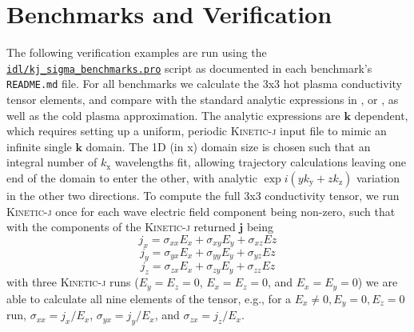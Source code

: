 \documentclass[final,5p,times,twocolumn]{elsarticle}
\renewcommand{\vec}[1]{\mathbf{#1}}
\newcommand{\kj}{\textsc{Kinetic-j}\xspace}
\begin{document}
\section{Benchmarks and Verification}
\label{section:verification}
The following verification examples are run using the \href{https://github.com/ORNL-Fusion/kineticj/blob/master/idl/kj_sigma_benchmarks.pro}{\texttt{idl/kj\_sigma\_benchmarks.pro}} script as documented in each benchmark's \texttt{README.md} file.
%
For all benchmarks we calculate the 3x3 hot plasma conductivity tensor elements, and compare with the standard analytic expressions in \cite[pg. 255 of ][]{brambilla}, or \cite[pg. 176 of][]{swanson}, as well as the cold plasma approximation. The analytic expressions are $\vec{k}$ dependent, which requires setting up a uniform, periodic \kj input file to mimic an infinite single $\vec{k}$ domain. The 1D (in x) domain size is chosen such that an integral number of $k_{\mathrm{x}}$ wavelengths fit, allowing trajectory calculations leaving one end of the domain to enter the other, with analytic $\exp{i\left(yk_{\mathrm{y}}+zk_{\mathrm{z}}\right)}$ variation in the other two directions. To compute the full 3x3 conductivity tensor, we run \kj once for each wave electric field component being non-zero, such that with the components of the \kj returned $\vec{j}$ being 
%
\begin{equation} 
j_x = \sigma_{xx}E_x+\sigma_{xy}E_y+\sigma_{xz}Ez
\end{equation}
\begin{equation} 
j_y = \sigma_{yx}E_x+\sigma_{yy}E_y+\sigma_{yz}Ez
\end{equation}
\begin{equation} 
j_z = \sigma_{zx}E_x+\sigma_{zy}E_y+\sigma_{zz}Ez
\end{equation}
%
with three \kj runs ($E_y=E_z=0$, $E_x=E_z=0$, and $E_x=E_y=0$) we are able to calculate all nine elements of the tensor, e.g., for a $E_x\ne0,E_y=0,E_z=0$ run, $\sigma_{xx}=j_x/E_x$, $\sigma_{yx}=j_y/E_x$, and $\sigma_{zx}=j_z/E_x$. 
%
\end{document}
